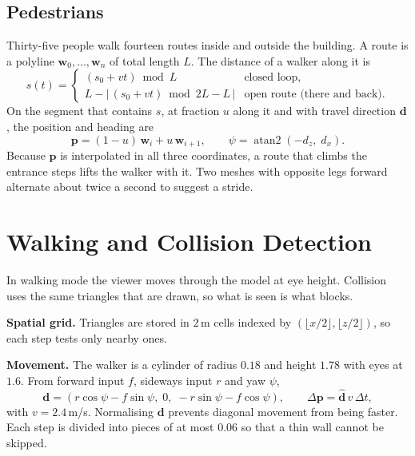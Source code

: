 \documentclass[11pt,a4paper]{article}
\newcommand{\vect}[1]{\mathbf{#1}}
\begin{document}
\subsection{Pedestrians}
Thirty-five people walk fourteen routes inside and outside the building. A
route is a polyline $\vect w_0,\dots,\vect w_n$ of total length $L$. The
distance of a walker along it is
\begin{equation}
s(t)=\begin{cases}
(s_0+vt)\bmod L & \text{closed loop},\\[2pt]
L-\bigl|\,(s_0+vt)\bmod 2L-L\,\bigr| & \text{open route (there and back)}.
\end{cases}
\end{equation}
On the segment that contains $s$, at fraction $u$ along it and with travel
direction $\vect d$, the position and heading are
\begin{equation}
\vect p=(1-u)\,\vect w_i+u\,\vect w_{i+1},\qquad
\psi=\operatorname{atan2}(-d_z,\;d_x).
\end{equation}
Because $\vect p$ is interpolated in all three coordinates, a route that
climbs the entrance steps lifts the walker with it. Two meshes with opposite
legs forward alternate about twice a second to suggest a stride.

\section{Walking and Collision Detection}\label{sec:walk}
In walking mode the viewer moves through the model at eye height. Collision
uses the same triangles that are drawn, so what is seen is what blocks.

\textbf{Spatial grid.} Triangles are stored in $2$\,m cells indexed by
$(\lfloor x/2\rfloor,\lfloor z/2\rfloor)$, so each step tests only nearby ones.

\textbf{Movement.} The walker is a cylinder of radius $0.18$ and height
$1.78$ with eyes at $1.6$. From forward input $f$, sideways input $r$ and yaw $\psi$,
\begin{equation}
\vect d=(r\cos\psi-f\sin\psi,\;0,\;-r\sin\psi-f\cos\psi),\qquad
\Delta\vect p=\hat{\vect d}\,v\,\Delta t ,
\end{equation}
with $v=2.4$\,m/s. Normalising $\vect d$ prevents diagonal movement from
being faster. Each step is divided into pieces of at most $0.06$ so that a
thin wall cannot be skipped.
\end{document}
